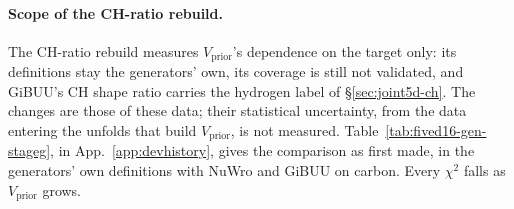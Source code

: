 \paragraph{Scope of the CH-ratio rebuild.} The CH-ratio rebuild measures $V_{\mathrm{prior}}$'s dependence on the target only: its definitions stay the generators' own, its coverage is still not validated, and GiBUU's CH shape ratio carries the hydrogen label of \S\ref{sec:joint5d-ch}. The changes are those of these data; their statistical uncertainty, from the data entering the unfolds that build $V_{\mathrm{prior}}$, is not measured. Table~\ref{tab:fived16-gen-stageg}, in App.~\ref{app:devhistory}, gives the comparison as first made, in the generators' own definitions with NuWro and GiBUU on carbon. Every $\chi^2$ falls as $V_{\mathrm{prior}}$ grows.
